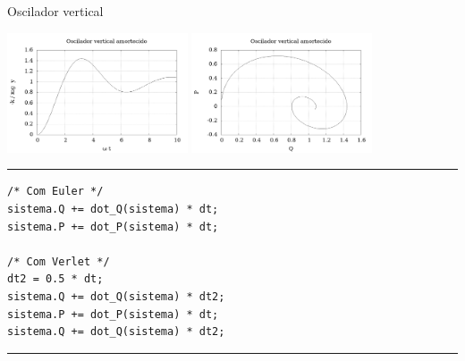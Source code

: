 \documentclass{beamer}
\begin{document}
\begin{frame}[fragile]{Oscilador vertical}%
   \begin{center}
      \includegraphics[width=0.4\textwidth]{code/oscilador.png}
      \includegraphics[width=0.4\textwidth]{code/oscilador_PS.png}
   \end{center}
   \rule{\textwidth}{1pt}
   \scriptsize
\begin{lstlisting}[style = c]
/* Com Euler */
sistema.Q += dot_Q(sistema) * dt;
sistema.P += dot_P(sistema) * dt;

/* Com Verlet */
dt2 = 0.5 * dt;
sistema.Q += dot_Q(sistema) * dt2;
sistema.P += dot_P(sistema) * dt;
sistema.Q += dot_Q(sistema) * dt2;
\end{lstlisting}
   \rule{\textwidth}{1pt}
\end{frame}
\end{document}
